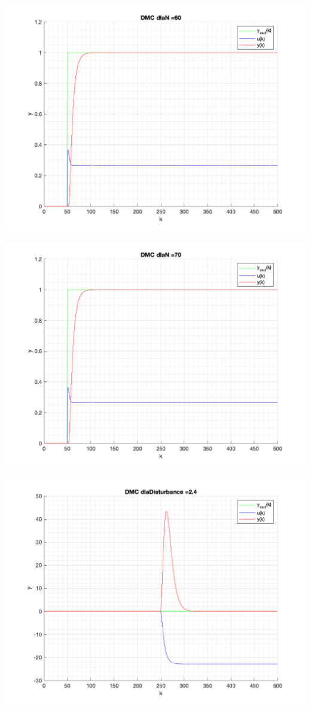 \documentclass[a4paper, 11pt]{article}
\begin{document}
\begin{enumerate}
 \includegraphics[width=\linewidth]{./ModelsP4_N/P4_DMC_N_60_png.png} 
 
 \includegraphics[width=\linewidth]{./ModelsP4_N/P4_DMC_N_70_png.png} 
 
 \includegraphics[width=\linewidth]{./ModelsP4_Disturbance/P4_DMC_Disturbance_2_4_png.png} 
 

\end{enumerate}
\end{document}
